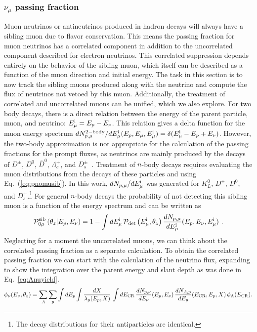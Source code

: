 \subsubsection{$\nu_\mu$ passing fraction}

Muon neutrinos or antineutrinos produced in hadron decays will always have a sibling muon due to flavor conservation.
This means the passing fraction for muon neutrinos has a correlated component in addition to the uncorrelated component described for electron neutrinos.
This correlated suppression depends entirely on the behavior of the sibling muon, which itself can be described as a function of the muon direction and initial energy.
The task in this section is to now track the sibling muons produced along with the neutrino and compute the flux of neutrinos not vetoed by this muon.
Additionally, the treatment of correlated and uncorrelated muons can be unified, which we also explore.
For two body decays, there is a direct relation between the energy of the parent particle, muon, and neutrino: $E_{\mu}^{\rm i} = E_p - E_\nu$.
This relation gives a delta function for the muon energy spectrum $dN_{p,\mu}^{\rm 2-body}/dE_{\mu}^{\rm i} (E_p,E_\mu,E_{\mu}^{\rm i})=\delta(E_{\mu}^{\rm i}-E_p+E_\nu)$.
However, the two-body approximation is not appropriate for the calculation of the passing fractions for the prompt fluxes, as neutrinos are mainly produced by the decays of $D^{\pm}$, $D^0$, $\bar{D}^0$, $\Lambda_c^+$, and $D_s^{\pm}$~\cite{Fedynitch:2015zma}.
Treatment of $n$-body decays requires evaluating the muon distributions from the decays of these particles and using Eq.~(\ref{eq:pnomusib}).
In this work, $dN_{p, \mu}/dE_{\mu}^{\rm i}$ was generated for $K^0_L$, $D^+$, $D^0$, and $D^+_s$.\footnote{The decay distributions for their antiparticles are identical.}
For general $n$-body decays the probability of not detecting this sibling muon is a function of the energy spectrum and can be written as
\begin{equation}
\label{eq:pnomusib}
{\cal P}_{0\mu}^{\rm sib} \left(\theta_z|E_p, E_\nu \right) = 1 - \int dE_{\mu}^{\rm i} \, {\cal P}_{\rm det}\left(E_{\mu}^{\rm i}, \theta_z\right) \frac{dN_{p, \mu}}{dE_{\mu}^{\rm i}}(E_p, E_\nu, E_{\mu}^{\rm i}) ~.
\end{equation}
Neglecting for a moment the uncorrelated muons, we can think about the correlated passing fraction as a separate calculation.
To obtain the correlated passing fraction we can start with the calculation of the neutrino flux, expanding to show the integration over the parent energy and slant depth as was done in Eq.~\ref{eq:Anuyield}.
\begin{equation}
\label{eq:nufluxcorexpanded}
\phi_\nu(E_\nu, \theta_z) = \sum_A \sum_{p} \int dE_p  \int \frac{dX}{\lambda_p(E_p, X)} \, \int dE_{\rm CR} \, \frac{dN_{p, \nu}}{dE_\nu}(E_p, E_\nu) \, \frac{dN_{A, p}}{dE_p}(E_{\rm CR}, E_p, X) \, \phi_{\rm A} (E_{\rm CR}).
\end{equation}
